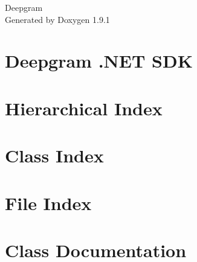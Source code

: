 \let\mypdfximage\pdfximage\def\pdfximage{\immediate\mypdfximage}\documentclass[twoside]{book}
\newcommand{\+}{\discretionary{\mbox{\scriptsize$\hookleftarrow$}}{}{}}
\newcommand{\clearemptydoublepage}{%
  \newpage{\pagestyle{empty}\cleardoublepage}%
}
\begin{document}
\raggedbottom

\hypersetup{pageanchor=false,
             bookmarksnumbered=true,
             pdfencoding=unicode
            }
\begin{titlepage}
\vspace*{7cm}
\begin{center}%
{\Large Deepgram }\\
\vspace*{1cm}
{\large Generated by Doxygen 1.9.1}\\
\end{center}
\end{titlepage}
\clearemptydoublepage
{}
\tableofcontents
\clearemptydoublepage
{}
\hypersetup{pageanchor=true}

\chapter{Deepgram .NET SDK}
\label{md_Deepgram_README}

\chapter{Hierarchical Index}

\chapter{Class Index}

\chapter{File Index}

\chapter{Class Documentation}



































\end{document}
